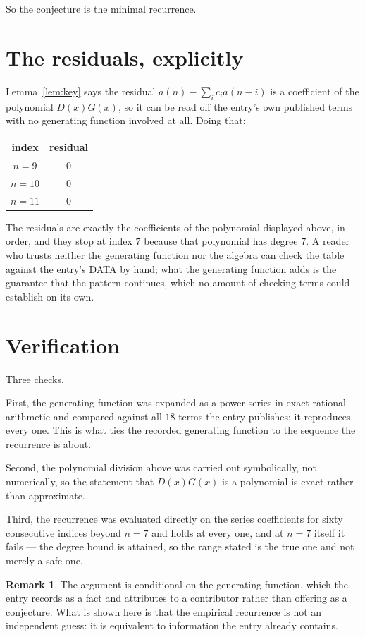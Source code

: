 \documentclass[11pt,a4paper]{article}
\theoremstyle{plain}
\theoremstyle{definition}
\newtheorem{remark}[theorem]{Remark}
\begin{document}
So the conjecture is the minimal recurrence.

\section{The residuals, explicitly}

Lemma~\ref{lem:key} says the residual $a(n)-\sum_ic_ia(n-i)$ is a coefficient of the
polynomial $D(x)G(x)$, so it can be read off the entry's own published terms with no
generating function involved at all. Doing that:
\begin{center}
\begin{tabular}{cc}
index & residual \\ \hline
$n=9$ & $0$ \\
$n=10$ & $0$ \\
$n=11$ & $0$
\end{tabular}
\end{center}
The residuals are exactly the coefficients of the polynomial displayed above, in order, and
they stop at index $7$ because that polynomial has degree $7$. A reader who trusts
neither the generating function nor the algebra can check the table against the entry's DATA
by hand; what the generating function adds is the guarantee that the pattern continues, which
no amount of checking terms could establish on its own.

\section{Verification}

Three checks.

First, the generating function was expanded as a power series in exact rational arithmetic and
compared against all $18$ terms the entry publishes: it reproduces every one. This is
what ties the recorded generating function to the sequence the recurrence is about.

Second, the polynomial division above was carried out symbolically, not numerically, so the
statement that $D(x)G(x)$ is a polynomial is exact rather than approximate.

Third, the recurrence was evaluated directly on the series coefficients for sixty consecutive
indices beyond $n=7$ and holds at every one, and at $n=7$ itself it fails --- the
degree bound is attained, so the range stated is the true one and not merely a safe one.

\begin{remark}
The argument is conditional on the generating function, which the entry records as a fact and
attributes to a contributor rather than offering as a conjecture. What is shown here is that
the empirical recurrence is not an independent guess: it is equivalent to information the
entry already contains.
\end{remark}
\end{document}
